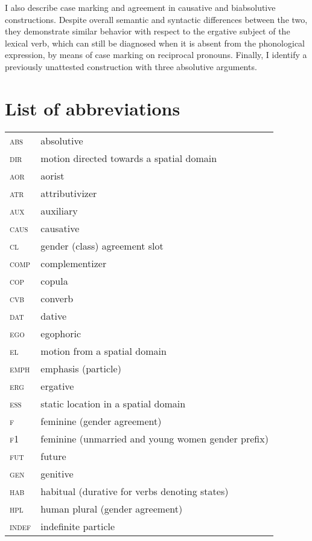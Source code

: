 ﻿\documentclass[output=paper]{langsci/langscibook}
\begin{document}
I also describe case marking and agreement in causative and
biabsolutive constructions. Despite overall semantic and syntactic
differences between the two, they demonstrate similar behavior with
respect to the ergative subject of the lexical verb, which can still be
diagnosed when it is absent from the phonological expression, by means
of case marking on reciprocal pronouns. Finally, I identify a previously
unattested construction with three absolutive arguments.


\section*{List of abbreviations}

\begin{longtable}[l]{@{}ll@{}}
\textsc{abs}	& absolutive \\
\textsc{dir}	& motion directed towards a spatial domain \\
\textsc{aor}	& aorist \\
\textsc{atr}	& attributivizer \\
\textsc{aux}	& auxiliary \\
\textsc{caus}	& causative \\
\textsc{cl}	& gender (class) agreement slot \\
\textsc{comp}	& complementizer \\
\textsc{cop}	& copula \\
\textsc{cvb}	& converb \\
\textsc{dat}	& dative \\
\textsc{ego}	& egophoric \\
\textsc{el}	& motion from a spatial domain \\
\textsc{emph}	& emphasis (particle) \\
\textsc{erg}	& ergative \\
\textsc{ess}	& static location in a spatial domain \\
\textsc{f}	& feminine (gender agreement) \\
\textsc{f1}	& feminine (unmarried and young women gender prefix) \\
\textsc{fut}	& future \\
\textsc{gen}	& genitive \\
\textsc{hab}	& habitual (durative for verbs denoting states) \\
\textsc{hpl}	& human plural (gender agreement) \\
\textsc{indef}	& indefinite particle \\

\end{longtable}
\end{document}
